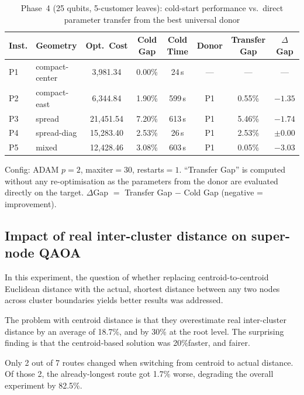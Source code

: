 \documentclass[a4paper]{report}
\begin{document}
{\begin{itemize}
\begin{itemize}
\begin{table}[ht]
\centering
\setlength{\tabcolsep}{5pt}
\begin{tabular}{llcccccc}
\toprule
\textbf{Inst.} & \textbf{Geometry} & \textbf{Opt.\ Cost}
  & \textbf{Cold Gap} & \textbf{Cold Time}
  & \textbf{Donor} & \textbf{Transfer Gap} & \textbf{$\Delta$Gap} \\
\midrule
P1 & compact-center & 3{,}981.34 & 0.00\%  &   24\,s & —  & —      & —       \\
P2 & compact-east   & 6{,}344.84 & 1.90\%  &  599\,s & P1 & 0.55\% & $-1.35$ \\
P3 & spread         & 21{,}451.54 & 7.20\% &  613\,s & P1 & 5.46\% & $-1.74$ \\
P4 & spread-diag    & 15{,}283.40 & 2.53\% &   26\,s & P1 & 2.53\% & $\pm0.00$ \\
P5 & mixed          & 12{,}428.46 & 3.08\% &  603\,s & P1 & 0.05\% & $\mathbf{-3.03}$ \\
\bottomrule
\end{tabular}
\caption{Phase~4 (25 qubits, 5-customer leaves): cold-start performance vs.\ direct parameter transfer from the best universal donor}
\label{tab:ws5cust}
\end{table} 

Config: ADAM $p{=}2$, maxiter$=30$, restarts$=1$. ``Transfer Gap'' is computed without any re-optimisation as the parameters from the donor are evaluated directly on the target. $\Delta$Gap $= $ Transfer Gap $-$ Cold Gap (negative = improvement).



\subsection{Impact of real inter-cluster distance on super-node QAOA}
\label{impactof interclus}
In this experiment, the question of whether replacing centroid-to-centroid Euclidean distance with the actual, shortest distance between any two nodes across cluster boundaries yields better results was addressed.

The problem with centroid distance is that they overestimate real inter-cluster distance by an average of 18.7\%, and by 30\% at the root level. The surprising finding is that the centroid-based solution was 20\%faster, and fairer.

Only 2 out of 7 routes changed when switching from centroid to actual distance. Of those 2, the already-longest route got 1.7\% worse, degrading the overall experiment by 82.5\%. 


\end{itemize}
\end{itemize}}
\end{document}
